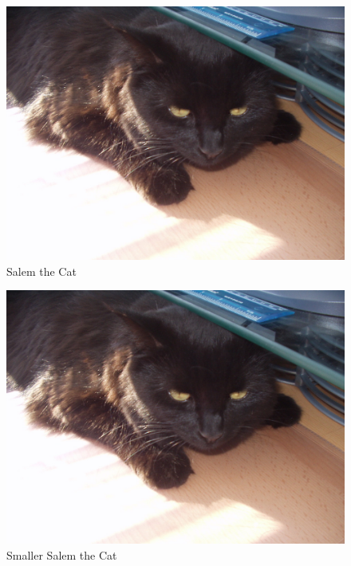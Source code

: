 \documentclass[10pt,a4paper]{article}
\begin{document}
\begin{figure}[ht]
	\centering
	\includegraphics[width = .95\linewidth]{images/Salem.JPG}
	\caption{Salem the Cat}
\end{figure}

\begin{figure}[ht]
	\centering
	\includegraphics[scale=0.1]{images/Salem.JPG}
	\caption{Smaller Salem the Cat}
\end{figure}
\end{document}
